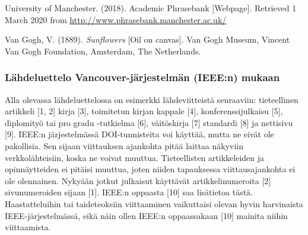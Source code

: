 \documentclass[finnish, 12pt, a4paper, elec, utf8, a-2b, online]{aaltothesis}
\begin{document}
\vspace{1ex}
\noindent
University of Manchester. (2018). Academic Phrasebank [Webpage]. 
Retrieved 1 March 2020 from \url{http://www.phrasebank.manchester.ac.uk/}

\vspace{1ex}
\noindent
Van Gogh, V. (1889). \textit{Sunflowers} [Oil on canvas]. 
Van Gogh Museum, Vincent Van Gogh Foundation, Amsterdam, The Netherlands.


\subsubsection*{Lähdeluettelo Vancouver-järjestelmän (IEEE:n) mukaan}

Alla olevassa lähdeluettelossa on esimerkki lähdeviitteistä seuraaviin: 
tieteellinen artikkeli [1, 2] kirja [3], toimitetun kirjan kappale [4], 
konferenssijulkaisu [5], diplomityö tai pro gradu -tutkielma [6], väitöskirja 
[7] standardi [8] ja nettisivu [9]. IEEE:n järjestelmässä DOI-tunnisteita voi 
käyttää, mutta ne eivät ole pakollisia. Sen sijaan viittauksen ajankohta pitää 
laittaa näkyviin verkkolähteisiin, koska ne voivat muuttua. Tieteellisten 
artikkeleiden ja opinnäytteiden ei pitäisi muuttua, joten niiden tapauksessa 
viittausajankohta ei ole olennainen. Nykyään jotkut julkaisut käyttävät 
artikkelinumeroita [2] sivunumeroiden sijaan [1]. IEEE:n oppaasta [10] saa 
lisätietoa tästä. Haastatteluihin tai taideteoksiin viittaaminen vaikuttaisi 
olevan hyvin harvinaista IEEE-järjestelmässä, eikä näin ollen IEEE:n 
oppaassakaan [10] mainita niihin viittaamista.
\end{document}
